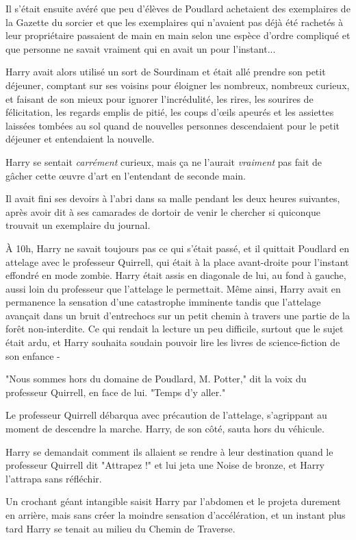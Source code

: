 Il s'était ensuite avéré que peu d'élèves de Poudlard achetaient des exemplaires de la Gazette du sorcier et que les exemplaires qui n'avaient pas déjà été rachetés à leur propriétaire passaient de main en main selon une espèce d'ordre compliqué et que personne ne savait vraiment qui en avait un pour l'instant...

Harry avait alors utilisé un sort de Sourdinam et était allé prendre son petit déjeuner, comptant sur ses voisins pour éloigner les nombreux, nombreux curieux, et faisant de son mieux pour ignorer l'incrédulité, les rires, les sourires de félicitation, les regards emplis de pitié, les coups d'œils apeurés et les assiettes laissées tombées au sol quand de nouvelles personnes descendaient pour le petit déjeuner et entendaient la nouvelle.

Harry se sentait \emph{carrément}  curieux, mais ça ne l'aurait \emph{vraiment}  pas fait de gâcher cette œuvre d'art en l'entendant de seconde main.

Il avait fini ses devoirs à l'abri dans sa malle pendant les deux heures suivantes, après avoir dit à ses camarades de dortoir de venir le chercher si quiconque trouvait un exemplaire du journal.

À 10h, Harry ne savait toujours pas ce qui s'était passé, et il quittait Poudlard en attelage avec le professeur Quirrell, qui était à la place avant-droite pour l'instant effondré en mode zombie. Harry était assis en diagonale de lui, au fond à gauche, aussi loin du professeur que l'attelage le permettait. Même ainsi, Harry avait en permanence la sensation d'une catastrophe imminente tandis que l'attelage avançait dans un bruit d'entrechocs sur un petit chemin à travers une partie de la forêt non-interdite. Ce qui rendait la lecture un peu difficile, surtout que le sujet était ardu, et Harry souhaita soudain pouvoir lire les livres de science-fiction de son enfance -

"Nous sommes hors du domaine de Poudlard, M. Potter," dit la voix du professeur Quirrell, en face de lui. "Temps d'y aller."

Le professeur Quirrell débarqua avec précaution de l'attelage, s'agrippant au moment de descendre la marche. Harry, de son côté, sauta hors du véhicule.

Harry se demandait comment ils allaient se rendre à leur destination quand le professeur Quirrell dit "Attrapez !" et lui jeta une Noise de bronze, et Harry l'attrapa sans réfléchir.

Un crochant géant intangible saisit Harry par l'abdomen et le projeta durement en arrière, mais sans créer la moindre sensation d'accélération, et un instant plus tard Harry se tenait au milieu du Chemin de Traverse.

